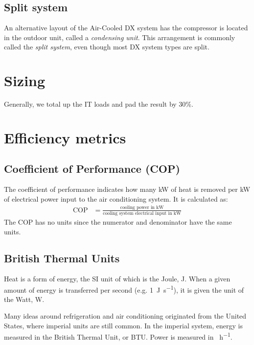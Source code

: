\documentclass{pgnotes}
\begin{document}
\subsection{Split system}

An alternative layout of the Air-Cooled DX system has the compressor is located in the outdoor unit, called a \textit{condensing unit}.
This arrangement is commonly called the \textit{split system}, even though most DX system types are split.




\section{Sizing}

Generally, we total up the IT loads and pad the result by 30\%.

\section{Efficiency metrics}

\subsection{Coefficient of Performance (COP)}

The coefficient of performance indicates how many \si{\kilo\watt} of heat is removed per \si{\kilo\watt} of electrical power input to the air conditioning system.
It is calculated as:
\begin{align}
  \mbox{COP} & = \frac{\mbox{cooling power in kW}}{\mbox{cooling system electrical input in kW}}
\end{align}
The COP has no units since the numerator and denominator have the same units.


\subsection{British Thermal Units}

Heat is a form of energy, the SI unit of which is the Joule, \si{\joule}.
When a given amount of energy is transferred per second (e.g. \SI{1}{\joule\per\second}), it is given the unit of the Watt, \si{\watt}.

Many ideas around refrigeration and air conditioning originated from the United States, where imperial units are still common.
In the imperial system, energy is measured in the British Thermal Unit, or BTU.
Power is measured in \si{\BTU\per\hour}. 
\end{document}

